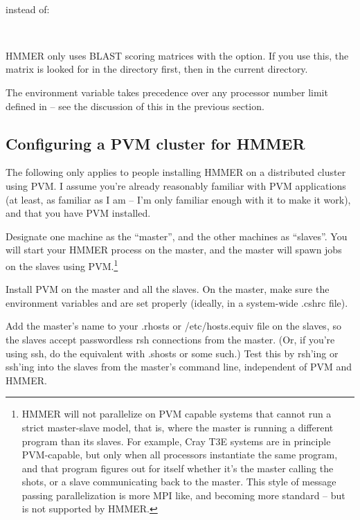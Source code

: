 \\

instead of:

\\

HMMER only uses BLAST scoring matrices with the  option. If you use this, the matrix is looked for in the
 directory first, then in the current directory.

The  environment variable takes precedence over any
 processor number limit defined in 
-- see the discussion of this in the previous section.

\subsection{Configuring a PVM cluster for HMMER}

The following only applies to people installing HMMER on a distributed
cluster using PVM. I assume you're already reasonably familiar with
PVM applications (at least, as familiar as I am -- I'm only familiar
enough with it to make it work), and that you have PVM installed.

Designate one machine as the ``master'', and the other machines as
``slaves''. You will start your HMMER process on the master, and the
master will spawn jobs on the slaves using PVM.\footnote{HMMER will
not parallelize on PVM capable systems that cannot run a strict
master-slave model, that is, where the master is running a different
program than its slaves. For example, Cray T3E systems are in
principle PVM-capable, but only when all processors instantiate the
same program, and that program figures out for itself whether it's the
master calling the shots, or a slave communicating back to the
master. This style of message passing parallelization is more MPI
like, and becoming more standard -- but is not supported by HMMER.}

Install PVM on the master and all the slaves. On the master, make sure
the environment variables  and  are
set properly (ideally, in a system-wide .cshrc file).

Add the master's name to your .rhosts or /etc/hosts.equiv file on the
slaves, so the slaves accept passwordless rsh connections from the
master. (Or, if you're using ssh, do the equivalent with .shosts or
some such.) Test this by rsh'ing or ssh'ing into the slaves from the
master's command line, independent of PVM and HMMER.

